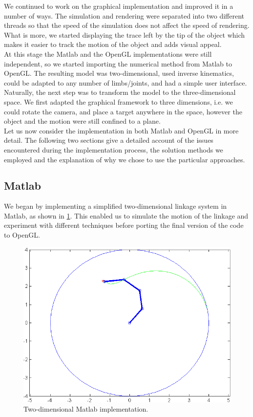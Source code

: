 \documentclass[paper=a4, fontsize=11pt]{scrartcl} %
\numberwithin{equation}{section} %
\numberwithin{figure}{section} %
\numberwithin{table}{section} %
\begin{document}
We continued to work on the graphical implementation and improved it in a number of ways. The simulation and rendering were separated into two different threads so that the speed of the simulation does not affect the speed of rendering. What is more, we started displaying the trace left by the tip of the object which makes it easier to track the motion of the object and adds visual appeal. \\

At this stage the Matlab and the OpenGL implementations were still independent, so we started importing the numerical method from Matlab to OpenGL. The resulting model was two-dimensional, used inverse kinematics, could be adapted to any number of limbs/joints, and had a simple user interface. \\

Naturally, the next step was to transform the model to the three-dimensional space. We first adapted the graphical framework to three dimensions, i.e. we could rotate the camera, and place a target anywhere in the space, however the object and the motion were still confined to a plane. \\

Let us now consider the implementation in both Matlab and OpenGL in more detail. The following two sections give a detailed account of the issues encountered during the implementation process, the solution methods we employed and the explanation of why we chose to use the particular approaches.

\subsection{Matlab}

We began by implementing a simplified two-dimensional linkage system in Matlab, as shown in \ref{fig:Matlabpicture}. This enabled us to simulate the motion of the linkage and experiment with different techniques before porting the final version of the code to OpenGL. \\

\begin{figure}
\centering
\includegraphics[scale=0.6]{chainMatlab}
\caption{Two-dimensional Matlab implementation.}
\label{fig:Matlabpicture}
\end{figure}
\end{document}

